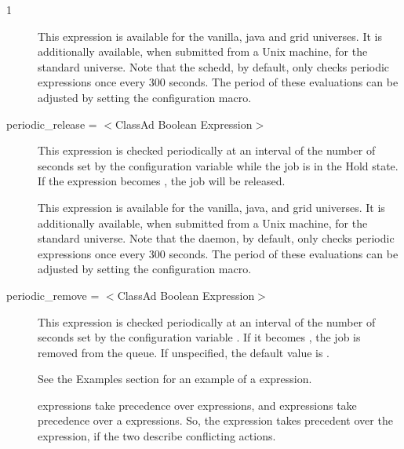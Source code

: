 \begin{ManPage}{\label{man-condor-submit}}{1}
\begin{description}
This expression is available for the vanilla, java and grid universes.
It is additionally available, when submitted from a Unix machine,
for the standard universe.  Note that the schedd, by default, only checks
periodic expressions once every 300 seconds.  The period of
these evaluations can be adjusted by setting the
 configuration macro.


\item[periodic\_release = $<$ClassAd Boolean Expression$>$]
This expression is checked periodically at an interval of
the number of seconds set by
the configuration variable 
while the job is in the Hold state.
If the expression becomes , the job will be released.

%

This expression is available for the vanilla, java, and grid universes.
It is additionally available, when submitted from a Unix machine,
for the standard universe.  Note that the  daemon,
by default, only checks
periodic expressions once every 300 seconds.  The period of
these evaluations can be adjusted by setting the
 configuration macro.


\item[periodic\_remove = $<$ClassAd Boolean Expression$>$]
This expression is checked periodically at an interval of
the number of seconds set by
the configuration variable .
If it becomes , the job is removed from the queue.
If unspecified, the default value is .

See the Examples section for an example of a 
expression.

 expressions take
precedence over  expressions,
and  expressions take
precedence over a  expressions.
So, the  expression takes precedent over
the  expression,
if the two describe conflicting actions.


\end{description}
\end{ManPage}
